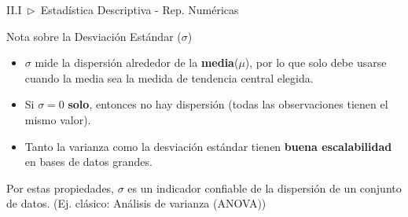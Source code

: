 \documentclass[xcolor=dvipsnames]{beamer}
\begin{document}
    \begin{frame}{II.I~$\rhd$~Estadística Descriptiva - Rep. Numéricas}
        \begin{block}{Nota sobre la Desviación Estándar ($\sigma$)}
            \begin{itemize}
                \item $\sigma$ mide la dispersión alrededor de la \textbf{media}($\mu$), por lo que solo debe usarse cuando la media sea la medida de tendencia central elegida.
                \item Si $\sigma=0$ \textbf{solo}, entonces no hay dispersión (todas las observaciones tienen el mismo valor).
                \item Tanto la varianza como la desviación estándar tienen \textbf{buena escalabilidad} en bases de datos grandes.
            \end{itemize}
            \vspace{3mm}
            Por estas propiedades, $\sigma$ es un indicador confiable de la dispersión de un conjunto de datos. (Ej. clásico: Análisis de varianza (ANOVA))
        \end{block}
    \end{frame}
\end{document}
